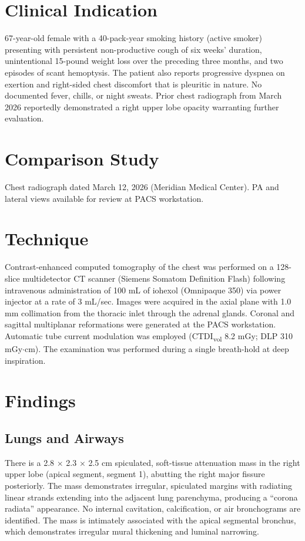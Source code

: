 \documentclass[11pt]{article}
\begin{document}
\section{Clinical Indication}

67-year-old female with a 40-pack-year smoking history (active smoker) presenting with persistent non-productive cough of six weeks' duration, unintentional 15-pound weight loss over the preceding three months, and two episodes of scant hemoptysis. The patient also reports progressive dyspnea on exertion and right-sided chest discomfort that is pleuritic in nature. No documented fever, chills, or night sweats. Prior chest radiograph from March 2026 reportedly demonstrated a right upper lobe opacity warranting further evaluation.

\section{Comparison Study}

Chest radiograph dated March 12, 2026 (Meridian Medical Center). PA and lateral views available for review at PACS workstation.

\section{Technique}

Contrast-enhanced computed tomography of the chest was performed on a 128-slice multidetector CT scanner (Siemens Somatom Definition Flash) following intravenous administration of 100 mL of iohexol (Omnipaque 350) via power injector at a rate of 3 mL/sec. Images were acquired in the axial plane with 1.0 mm collimation from the thoracic inlet through the adrenal glands. Coronal and sagittal multiplanar reformations were generated at the PACS workstation. Automatic tube current modulation was employed (CTDI\textsubscript{vol} 8.2 mGy; DLP 310 mGy$\cdot$cm). The examination was performed during a single breath-hold at deep inspiration.

\section{Findings}

\subsection{Lungs and Airways}

There is a 2.8 $\times$ 2.3 $\times$ 2.5 cm spiculated, soft-tissue attenuation mass in the right upper lobe (apical segment, segment 1), abutting the right major fissure posteriorly. The mass demonstrates irregular, spiculated margins with radiating linear strands extending into the adjacent lung parenchyma, producing a ``corona radiata'' appearance. No internal cavitation, calcification, or air bronchograms are identified. The mass is intimately associated with the apical segmental bronchus, which demonstrates irregular mural thickening and luminal narrowing.
\end{document}

